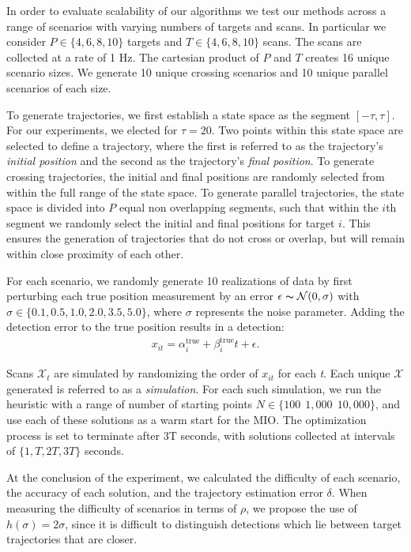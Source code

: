 In order to evaluate scalability of our algorithms we test our methods across a range of scenarios with varying numbers of targets and scans. In particular we consider $ P \in \{4,6,8,10\}$ targets and $T \in \{4,6,8,10\}$ scans. The scans are collected at a rate of 1 Hz. The cartesian product of $P$ and $T$ creates 16 unique scenario sizes. We generate 10 unique crossing scenarios and 10 unique parallel scenarios of each size. 

To generate trajectories, we first establish a state space as the segment $[-\tau,\tau]$. For our experiments, we elected for $\tau = 20$. Two points within this state space are selected to define a trajectory, where the first is referred to as the trajectory's \textit{initial position} and the second as the trajectory's \textit{final position}. To generate crossing trajectories, the initial and final positions are randomly selected from within the full range of the state space. To generate parallel trajectories, the state space is divided into $P$ equal non overlapping segments, such that within the $i$th segment we randomly select the initial and final positions for target $i$. This ensures the generation of trajectories that do not cross or overlap, but will remain within close proximity of each other. 

For each scenario, we randomly generate 10 realizations of data by first perturbing each true position measurement by an error $\epsilon \thicksim \mathcal{N}(0,\sigma)$ with $\sigma \in \{0.1,0.5,1.0,2.0,3.5,5.0\}$, where $\sigma$ represents the noise parameter. Adding the detection error to the true position results in a detection:
\begin{align*}
	x_{it} = \alpha^{\text{true}}_{i} + \beta^{\text{true}}_{i}t+\epsilon.
\end{align*}

Scans $\mathcal{X}_{t}$ are simulated by randomizing the order of $x_{it}$ for each \textit{t}. Each unique $\boldsymbol{\mathcal{X}}$ generated is referred to as a \textit{simulation}. For each such simulation, we run the heuristic with a range of number of starting points $N \in \{100\ \ 1,000\ \ 10,000\}$, and use each of these solutions as a warm start for the MIO. The optimization process is set to terminate after 3T seconds, with solutions collected at intervals of $\{1,T,2T,3T\}$ seconds.

At the conclusion of the experiment, we calculated the difficulty of each scenario, the accuracy of each solution, and the trajectory estimation error $\delta$. When measuring the difficulty of scenarios in terms of $\rho$, we propose the use of $h(\sigma)=2\sigma$, since it is difficult to distinguish detections which lie between target trajectories that are closer.

